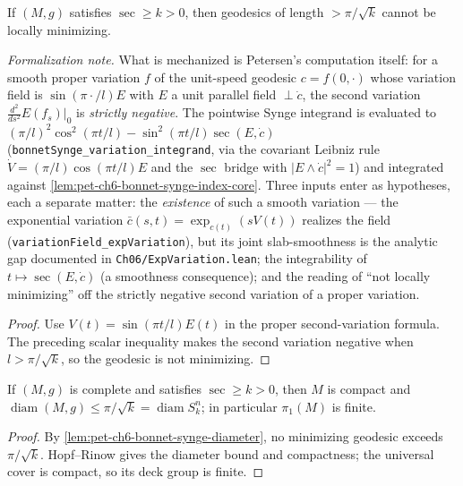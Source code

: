 \begin{lemma}
  \label{lem:pet-ch6-bonnet-synge-diameter}
  \leanok
  If $(M,g)$ satisfies $\sec\ge k>0$, then geodesics of length $>\pi/\sqrt k$
  cannot be locally minimizing.

  \emph{Formalization note.} What is mechanized is Petersen's computation itself: for a smooth
  proper variation $f$ of the unit-speed geodesic $c=f(0,\cdot)$ whose variation field is
  $\sin(\pi\cdot/l)E$ with $E$ a unit parallel field $\perp\dot c$, the second variation
  $\tfrac{d^2}{ds^2}E(f_s)|_{0}$ is \emph{strictly negative}. The pointwise Synge integrand is
  evaluated to $(\pi/l)^2\cos^2(\pi t/l)-\sin^2(\pi t/l)\sec(E,\dot c)$
  (\texttt{bonnetSynge\_variation\_integrand}, via the covariant Leibniz rule
  $\dot V=(\pi/l)\cos(\pi t/l)E$ and the $\sec$ bridge with $|E\wedge\dot c|^2=1$) and
  integrated against \cref{lem:pet-ch6-bonnet-synge-index-core}. Three inputs enter as
  hypotheses, each a separate matter: the \emph{existence} of such a smooth variation — the
  exponential variation $\bar c(s,t)=\exp_{c(t)}(sV(t))$ realizes the field
  (\texttt{variationField\_expVariation}), but its joint slab-smoothness is the analytic gap
  documented in \texttt{Ch06/ExpVariation.lean}; the integrability of $t\mapsto\sec(E,\dot c)$
  (a smoothness consequence); and the reading of ``not locally minimizing'' off the strictly
  negative second variation of a proper variation.
\end{lemma}
\begin{proof}
  \sketch
  Use \(V(t)=\sin(\pi t/l)E(t)\) in the proper second-variation formula. The preceding scalar inequality makes the second variation negative when \(l>\pi/\sqrt{k}\), so the geodesic is not minimizing.
\end{proof}

\begin{corollary}
  \label{cor:pet-ch6-hopf-rinow-myers-diameter}
  \notready
  \notready
  If $(M,g)$ is complete and satisfies $\sec\ge k>0$, then $M$ is compact and
  $\operatorname{diam}(M,g)\le\pi/\sqrt k=\operatorname{diam}S^n_k$; in particular $\pi_1(M)$ is
  finite.
\end{corollary}
\begin{proof}
  \sketch
  By \cref{lem:pet-ch6-bonnet-synge-diameter}, no minimizing geodesic exceeds \(\pi/\sqrt{k}\). Hopf--Rinow gives the diameter bound and compactness; the universal cover is compact, so its deck group is finite.
\end{proof}

